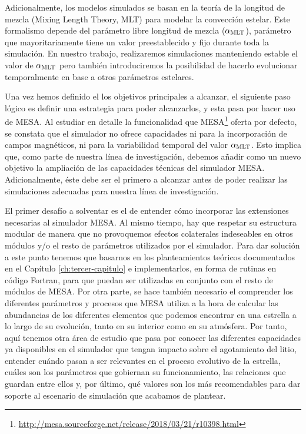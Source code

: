 Adicionalmente, los modelos simulados se basan en la teoría de la longitud de mezcla (Mixing Length Theory, MLT) para modelar la convección estelar. Este formalismo depende del parámetro libre longitud de mezcla ($\alpha_{\mathrm{MLT}}$), parámetro que mayoritariamente tiene un valor preestablecido y fijo durante toda la simulación. En nuestro trabajo, realizaremos simulaciones manteniendo estable el valor de $\alpha_{\mathrm{MLT}}$ pero también introduciremos la posibilidad de hacerlo evolucionar temporalmente en base a otros parámetros estelares.\par

Una vez hemos definido el los objetivos principales a alcanzar, el siguiente paso lógico es definir una estrategia para poder alcanzarlos, y esta pasa por hacer uso de MESA. Al estudiar en detalle la funcionalidad que MESA\footnote{\url{http://mesa.sourceforge.net/release/2018/03/21/r10398.html}} oferta por defecto, se constata que el simulador no ofrece capacidades ni para la incorporación de campos magnéticos, ni para la variabilidad temporal del valor $\alpha_{\mathrm{MLT}}$. Esto implica que, como parte de nuestra línea de investigación, debemos añadir como un nuevo objetivo la ampliación de las capacidades técnicas del simulador MESA. Adicionalmente, éste debe ser el primero a alcanzar antes de poder realizar las simulaciones adecuadas para nuestra línea de investigación.\par

El primer desafío a solventar es el de entender cómo incorporar las extensiones necesarias al simulador MESA. Al mismo tiempo, hay que respetar su estructura modular de manera que no provoquemos efectos colaterales indeseables en otros módulos y/o el resto de parámetros utilizados por el simulador. Para dar solución a este punto tenemos que basarnos en los planteamientos teóricos documentados en el Capítulo \ref{ch:tercer-capitulo} e implementarlos, en forma de rutinas en código Fortran, para que puedan ser utilizadas en conjunto con el resto de módulos de MESA. Por otra parte, se hace también necesario el comprender los diferentes parámetros y procesos que MESA utiliza a la hora de calcular las abundancias de los diferentes elementos que podemos encontrar en una estrella a lo largo de su evolución, tanto en su interior como en su atmósfera. Por tanto, aquí tenemos otra área de estudio que pasa por conocer las diferentes capacidades ya disponibles en el simulador que tengan impacto sobre el agotamiento del litio, entender cuándo pasan a ser relevantes en el proceso evolutivo de la estrella, cuáles son los parámetros que gobiernan su funcionamiento, las relaciones que guardan entre ellos y, por último, qué valores son los más recomendables para dar soporte al escenario de simulación que acabamos de plantear.\par

